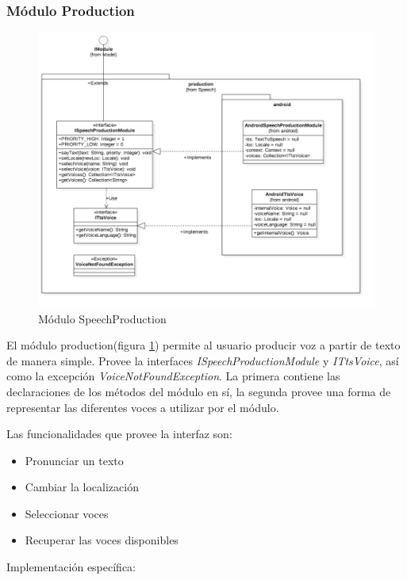 \subsubsection{Módulo Production}
\begin{figure}
	\centering
	\includegraphics[width=1\linewidth]{imagenes/diagramas/SpeechProductionModule.png}
	\caption{Módulo SpeechProduction}
	\label{fig:speech-production-module}
\end{figure}

El módulo production(figura \ref{fig:speech-production-module}) permite al usuario producir voz a partir de texto de manera simple.
Provee la interfaces \textit{ISpeechProductionModule} y \textit{ITtsVoice}, así como la excepción \textit{VoiceNotFoundException}.
La primera contiene las declaraciones de los métodos del módulo en sí, la segunda provee una forma de representar las diferentes voces a utilizar por el módulo.

Las funcionalidades que provee la interfaz son:

\begin{itemize}
	\item Pronunciar un texto
	\item Cambiar la localización 
	\item Seleccionar voces
	\item Recuperar las voces disponibles
\end{itemize}

 


Implementación específica:


